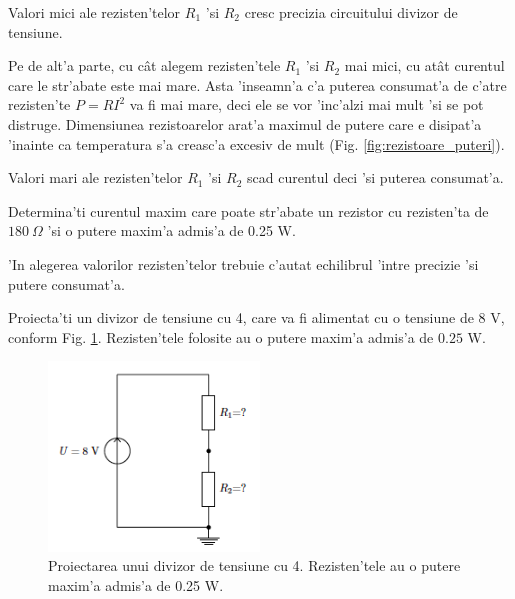 \begin{retine}
Valori mici ale rezisten'telor $R_1$ 'si $R_2$ cresc precizia circuitului divizor de tensiune.
\end{retine}

Pe de alt'a parte, cu c\^at alegem rezisten'tele $R_1$ 'si $R_2$ mai mici, cu at\^at curentul care le str'abate este mai mare. Asta 'inseamn'a c'a puterea consumat'a de c'atre rezisten'te $P = RI^2$ va fi mai mare, deci ele se vor 'inc'alzi mai mult 'si se pot distruge. Dimensiunea rezistoarelor arat'a maximul de putere care e disipat'a 'inainte ca temperatura s'a creasc'a excesiv de mult (Fig. \ref{fig:rezistoare_puteri}).

\begin{retine}
Valori mari ale rezisten'telor $R_1$ 'si $R_2$ scad curentul deci 'si puterea consumat'a.
\end{retine}

\begin{exercise}
Determina'ti curentul maxim care poate str'abate un rezistor cu rezisten'ta de $180~\Omega$ 'si o putere maxim'a admis'a de 0.25 W. 
\end{exercise}

'In alegerea valorilor rezisten'telor trebuie c'autat echilibrul 'intre precizie 'si putere consumat'a. 

\begin{exercise}
Proiecta'ti un divizor de tensiune cu 4, care va fi alimentat cu o tensiune de $8$ V, conform Fig. \ref{fig:7_exercitiul1}. Rezisten'tele folosite au o putere maxim'a admis'a de $0.25$ W.
\end{exercise}

\begin{figure}[!t]
	\centering
		\includegraphics[width=0.5\textwidth]{laborator_01/figuri/7_exercitiul1}
	\caption{Proiectarea unui divizor de tensiune cu 4. Rezisten'tele au o putere maxim'a admis'a de 0.25 W.}
	\label{fig:7_exercitiul1}
\end{figure}